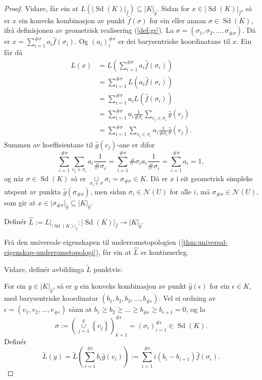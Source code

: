 \documentclass[a4paper, 12pt, norsk]{article}
\theoremstyle{plain}
\theoremstyle{definition}
\newcommand{\Nc}{\mathcal{N}}
\newcommand{\union}{ \mathop{\cup}\limits }
\newcommand{\gr}[1]{ \lvert #1 \rvert } %
\newcommand{\set}[1]{ \left\{ #1 \right\} } %
\newcommand{\tuple}[1]{ \left( #1 \right) } %
\DeclareMathOperator{\Sd}{Sd} %
\begin{document}
\begin{proof}
	Vidare, får ein at \( L(\gr{\Sd(K)}_{\hat{f}}) \subseteq \gr{K}_{\hat{g}} \). Sidan for \( x \in \gr{\Sd(K)}_{\hat{f}} \), så er \( x \) ein konveks kombinasjon av punkt \( \hat{f}(\sigma) \) for ein eller annan \( \sigma \in \Sd(K) \), ifrå definisjonen av geometrisk realisering (\autoref{def:gr}). La \( \sigma = (\sigma_1, \sigma_2, \dots, \sigma_{\#\sigma}) \). Då er \( x = \sum_{i=1}^{\#\sigma} a_i \hat{f}(\sigma_i) \). Og \( (a_i)_i^{\#\sigma} \) er dei barysentriske koordinatane til \( x \). Ein får då
	\begin{align*}
		L(x) &= L\left(\sum_{i=1}^{\#\sigma} a_i \hat{f}(\sigma_i)\right) \\
		&= \sum_{i=1}^{\#\sigma} L(a_i \hat{f}(\sigma_i)) \\
		&= \sum_{i=1}^{\#\sigma} a_i L(\hat{f}(\sigma_i)) \\
		&= \sum_{i=1}^{\#\sigma} a_i \frac{1}{\#\sigma_i} \sum_{v_j \in \sigma_i} \hat{g}(v_j) \\
		&= \sum_{i=1}^{\#\sigma} \sum_{v_j \in \sigma_i} a_i \frac{1}{\#\sigma_i} \hat{g}(v_j).
	\end{align*}
	Summen av koeffisientane til \( \hat{g}(v_j) \)-ane er difor
	\[
		\sum_{i=1}^{\#\sigma} \sum_{v_j \in \sigma_i} a_i \frac{1}{\#\sigma_i} = 
		\sum_{i=1}^{\#\sigma} \#\sigma_i a_i \frac{1}{\#\sigma_i} =
		\sum_{i=1}^{\#\sigma} a_i = 1,
	\]
	og når \( \sigma \in \Sd(K) \) så er \( \union_{\sigma_i \in \sigma} \sigma_i = \sigma_{\#\sigma} \in K \). Då er \( x \) i eit geometrisk simpleks utspent av punkta \( \hat{g}(\sigma_{\#\sigma}) \), men sidan \( \sigma_i \in \Nc(U) \) for alle \( i \), må \( \sigma_{\#\sigma} \in \Nc(U) \), som gir at \( x \in \gr{\sigma_{\#\sigma}}_{\hat{g}} \subseteq \gr{K}_{\hat{g}} \).

	Definér \( \hat{L} := L|_{\gr{\Sd(K)}_{\hat{f}}}: \gr{\Sd(K)}_{\hat{f}} \to \gr{K}_{\hat{g}} \).

	Frå den universale eigenskapen til underromstopologien (\autoref{thm:universal-eigenskap-underromstopologi}), får ein at \( \hat{L} \) er kontinuerleg.

	Vidare, definér avbildinga \( \tilde{L} \) punktvis:
	
	For ein \( y \in \gr{K}_{\hat{g}} \), så er \( y \) ein konveks kombinasjon av punkt \( \hat{g}(\epsilon) \) for ein \( \epsilon \in K \), med barysentriske koordinatar \( \tuple{b_1, b_2, b_3, \dots, b_{\#\epsilon}} \). Vel ei ordning av \( \epsilon = \tuple{v_1, v_2, \dots, v_{\#\epsilon}} \) sånn at \( b_1 \geq b_2 \geq \dots \geq b_{\#\epsilon} \geq  b_{\epsilon+1}=0 \), og la
	\[
		\sigma := \tuple{\union_{j=1}^k\set{v_j}}_{k=1}^{\#\epsilon} = \tuple{\sigma_i}_{i=1}^{\#\epsilon} \in \Sd(K).
	\]
	Definér
	\[
		\tilde{L}(y) = \tilde{L}\tuple{\sum_{i=1}^{\#\epsilon} b_i \hat{g}(v_i)} := \sum_{i=1}^{\#\epsilon}i\tuple{b_i-b_{i+1}}\hat{f}(\sigma_i).
	\]


\end{proof}
\end{document}

